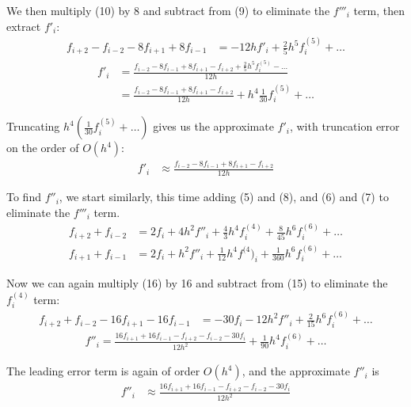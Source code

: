 \documentclass{article}
\begin{document}
We then multiply (10) by 8 and subtract from (9) to eliminate the $f'''_i$ term, then extract $f'_i$:
\begin{align}
  f_{i+2} - f_{i-2} - 8f_{i+1} + 8f_{i-1} &= -12hf'_i + \frac{2}{5}h^5 f^{(5)}_i + \dots
\end{align}
\begin{align}
  f'_i &= \frac{f_{i-2} - 8f_{i-1} + 8f_{i+1} - f_{i+2} + \frac{2}{5}h^5 f^{(5)}_i - \dots}{12h} \\
       &= \frac{f_{i-2} - 8f_{i-1} + 8f_{i+1} - f_{i+2}}{12h} + h^4\frac{1}{30}f^{(5)}_i + \dots
\end{align}

Truncating $h^4(\frac{1}{30}f^{(5)}_i + \dots)$ gives us the approximate $f'_i$, with truncation error on the order of $O(h^4)$:
\begin{align}
  f'_i &\approx \frac{f_{i-2} - 8f_{i-1} + 8f_{i+1} - f_{i+2}}{12h}
\end{align}

To find $f''_i$, we start similarly, this time adding (5) and (8), and (6) and (7) to eliminate the $f'''_i$ term.
\begin{align}
  f_{i+2} + f_{i-2} &= 2f_i + 4h^2f''_i + \frac{4}{3}h^4 f^{(4)}_i + \frac{8}{45}h^6 f^{(6)}_i + \dots \\
  f_{i+1} + f_{i-1} &= 2f_i + h^2f''_i + \frac{1}{12}h^4 f^{(4})_i + \frac{1}{360}h^6 f^{(6)}_i + \dots
\end{align}

Now we can again multiply (16) by 16 and subtract from (15) to eliminate the $f^{(4)}_i$ term:
\begin{align}
  f_{i+2} + f_{i-2} - 16f_{i+1} - 16f_{i-1} &= -30f_i - 12h^2f''_i + \frac{2}{15}h^6 f^{(6)}_i + \dots
\end{align}
\begin{align}
  f''_i = \frac{16f_{i+1} + 16f_{i-1} - f_{i+2} - f_{i-2} - 30f_i}{12h^2} + \frac{1}{90}h^4 f^{(6)}_i + \dots
\end{align}

The leading error term is again of order $O(h^4)$, and the approximate $f''_i$ is
\begin{align}
  f''_i &\approx \frac{16f_{i+1} + 16f_{i-1} - f_{i+2} - f_{i-2} - 30f_i}{12h^2}
\end{align}
\end{document}
